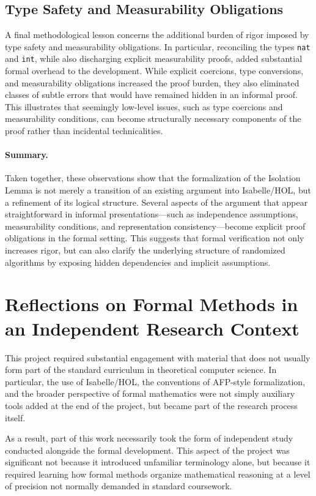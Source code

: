\subsection{Type Safety and Measurability Obligations}
A final methodological lesson concerns the additional burden of rigor imposed by type safety and measurability obligations.
In particular, reconciling the types \texttt{nat} and \texttt{int}, while also discharging explicit measurability proofs, added substantial formal overhead to the development.
While explicit coercions, type conversions, and measurability obligations increased the proof burden, they also eliminated classes of subtle errors that would have remained hidden in an informal proof.
This illustrates that seemingly low-level issues, such as type coercions and measurability conditions, can become structurally necessary components of the proof rather than incidental technicalities.

\paragraph{Summary.}
Taken together, these observations show that the formalization of the Isolation Lemma is not merely a transition of an existing argument into Isabelle/HOL, but a refinement of its logical structure.
Several aspects of the argument that appear straightforward in informal presentations---such as independence assumptions, measurability conditions, and representation consistency---become explicit proof obligations in the formal setting.
This suggests that formal verification not only increases rigor, but can also clarify the underlying structure of randomized algorithms by exposing hidden dependencies and implicit assumptions.

\section{Reflections on Formal Methods in an Independent Research Context}

This project required substantial engagement with material that does not usually form part of the standard curriculum in theoretical computer science.
In particular, the use of Isabelle/HOL, the conventions of AFP-style formalization, and the broader perspective of formal mathematics were not simply auxiliary tools added at the end of the project, but became part of the research process itself.

As a result, part of this work necessarily took the form of independent study conducted alongside the formal development.
This aspect of the project was significant not because it introduced unfamiliar terminology alone, but because it required learning how formal methods organize mathematical reasoning at a level of precision not normally demanded in standard coursework.

